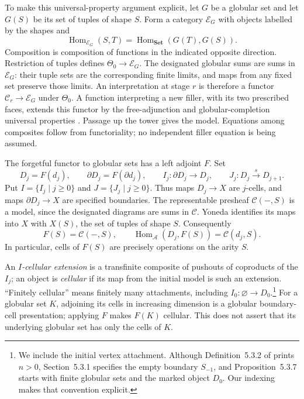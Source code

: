 \documentclass[11pt,letterpaper]{article}
\numberwithin{equation}{section}
\theoremstyle{plain}
\theoremstyle{definition}
\theoremstyle{remark}
\DeclareMathOperator{\Hom}{Hom}
\begin{document}
To make this universal-property argument explicit, let $G$ be a globular
set and let $G(S)$ be its set of tuples of shape $S$.  Form a category
$\mathcal E_G$ with objects labelled by the shapes and
\[
 \Hom_{\mathcal E_G}(S,T)=\Hom_{\mathbf{Set}}(G(T),G(S)).
\]
Composition is composition of functions in the indicated opposite
direction.  Restriction of tuples defines $\Theta_0\to\mathcal E_G$.
The designated globular sums are sums in $\mathcal E_G$: their tuple
sets are the corresponding finite limits, and maps from any fixed set
preserve those limits.  An interpretation at stage $r$ is therefore a
functor $\mathcal C_r\to\mathcal E_G$ under $\Theta_0$.  A function
interpreting a new filler, with its two prescribed faces, extends this
functor by the free-adjunction and globular-completion universal
properties \cite[Section~2.9]{Ara2013}.  Passage up the tower gives
the model.  Equations among composites follow from functoriality;
no independent filler equation is being assumed.

The forgetful functor to globular sets has a left adjoint $F$.  Set
\[
 D_j=F(d_j),\qquad \partial D_j=F(\partial d_j),\qquad
 I_j:\partial D_j\longrightarrow D_j,\qquad
 J_j:D_j\xrightarrow{s}D_{j+1}.
\]
Put $I=\{I_j\mid j\ge0\}$ and $J=\{J_j\mid j\ge0\}$.
Thus maps $D_j\to X$ are $j$-cells, and maps $\partial D_j\to X$ are
specified boundaries.  The representable presheaf $\mathcal C(-,S)$ is
a model, since the designated diagrams are sums in $\mathcal C$.
Yoneda identifies its maps into $X$ with $X(S)$, the set of tuples of
shape $S$.  Consequently
\begin{equation}\label{eq:prelim-free-shape}
 F(S)=\mathcal C(-,S),\qquad
 \Hom_{\mathcal A}(D_j,F(S))=\mathcal C(d_j,S).
\end{equation}
In particular, cells of $F(S)$ are precisely operations on the arity $S$.

An \emph{$I$-cellular extension} is a transfinite composite of pushouts
of coproducts of the $I_j$; an object is \emph{cellular} if its map from
the initial model is such an extension.  ``Finitely cellular'' means
finitely many attachments, including $I_0:\varnothing\to D_0$.\footnote{We
include the initial vertex attachment.  Although Definition~5.3.2 of
\cite{Henry2016} prints $n>0$, Section~5.3.1 specifies the empty boundary
$S_{-1}$, and Proposition~5.3.7 starts with finite globular sets and the
marked object $D_0$.  Our indexing makes that convention explicit.}
For a globular set $K$, adjoining its cells in increasing dimension is
a globular boundary-cell presentation; applying $F$ makes $F(K)$
cellular.  This does not assert that its underlying globular set has
only the cells of $K$.
\end{document}
